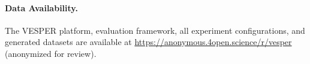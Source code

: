 \documentclass[sigconf,anonymous]{acmart}
\newcommand{\sys}{\textsc{VESPER}}
\begin{document}

\maketitle










\paragraph{Data Availability.}
The \sys{} platform, evaluation framework, all experiment
configurations, and generated datasets are available at
\url{https://anonymous.4open.science/r/vesper}
(anonymized for review).



\end{document}
